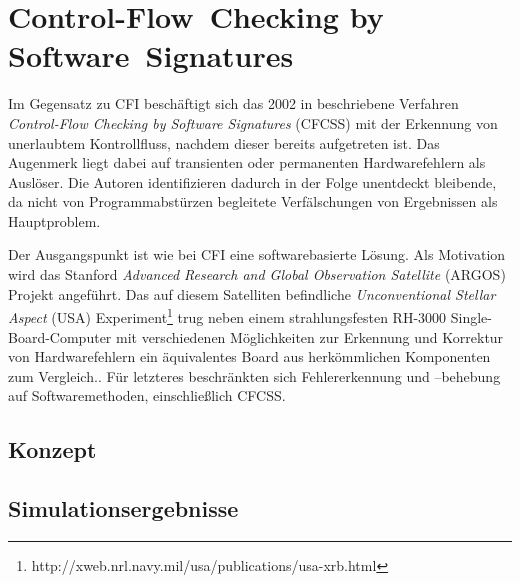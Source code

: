 \documentclass[11pt]{article}
\begin{document}

\section{Control-Flow~Checking by Software~Signatures}

Im Gegensatz zu CFI beschäftigt sich das 2002 in \cite{oh-2002-control}
beschriebene Verfahren \emph{Control-Flow Checking by Software Signatures}
(CFCSS) mit der Erkennung von unerlaubtem Kontrollfluss, nachdem dieser bereits
aufgetreten ist. Das Augenmerk liegt dabei auf transienten oder permanenten
Hardwarefehlern als Auslöser. Die Autoren identifizieren dadurch in der Folge
unentdeckt bleibende, da nicht von Programmabstürzen begleitete Verfälschungen
von Ergebnissen als Hauptproblem.

Der Ausgangspunkt ist wie bei CFI eine softwarebasierte Lösung. Als Motivation
wird das Stanford \emph{Advanced Research and Global Observation Satellite}
(ARGOS) Projekt angeführt. Das auf diesem Satelliten befindliche
\emph{Unconventional Stellar Aspect} (USA)
Experiment\footnote{http://xweb.nrl.navy.mil/usa/publications/usa-xrb.html}
trug neben einem strahlungsfesten RH-3000 Single-Board-Computer mit
verschiedenen Möglichkeiten zur Erkennung und Korrektur von Hardwarefehlern ein
äquivalentes Board aus herkömmlichen Komponenten zum
Vergleich.\cite{argos-2002-lessons}. Für letzteres beschränkten sich
Fehlererkennung und –behebung auf Softwaremethoden, einschließlich CFCSS.

\subsection{Konzept}

\subsection{Simulationsergebnisse}

\pagebreak


\end{document}
